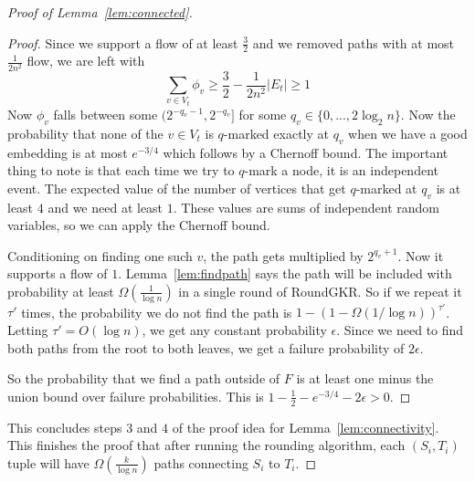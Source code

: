 \documentclass[12pt]{article}
\begin{document}
\begin{proof}[Proof of Lemma~\ref{lem:connected}]
\begin{proof}
Since we support a flow of at least $\frac{3}{2}$ and we removed paths with at most $\frac{1}{2n^2}$ flow, we are left with
\[ \sum_{v \in V_t} \phi_v \geq \frac{3}{2} - \dfrac{1}{2n^2}|E_t| \geq 1 \]
Now $\phi_v$ falls between some $(2^{-q_v-1}, 2^{-q_v}]$ for some $q_v \in \{0, ..., 2\log_2 n\}$. Now the probability that none of the $v \in V_t$ is $q$-marked exactly at $q_v$ when we have a good embedding is at most $e^{-3/4}$ which follows by a Chernoff bound. The important thing to note is that each time we try to $q$-mark a node, it is an independent event. The expected value of the number of vertices that get $q$-marked at $q_v$ is at least $4$ and we need at least $1$. These values are sums of independent random variables, so we can apply the Chernoff bound.

Conditioning on finding one such $v$, the path gets multiplied by $2^{q_v+1}$. Now it supports a flow of $1$. Lemma~\ref{lem:findpath} says the path will be included with probability at least $\Omega(\frac{1}{\log n})$ in a single round of RoundGKR. So if we repeat it $\tau'$ times, the probability we do not find the path is $1 - (1 - \Omega(1/\log n))^{\tau'}$. Letting $\tau' = O(\log n)$, we get any constant probability $\epsilon$. Since we need to find both paths from the root to both leaves, we get a failure probability of $2\epsilon$.

So the probability that we find a path outside of $F$ is at least one minus the union bound over failure probabilities. This is $1 - \frac{1}{2} - e^{-3/4} - 2\epsilon > 0$. 
\end{proof}

This concludes steps $3$ and $4$ of the proof idea for Lemma~\ref{lem:connectivity}. This finishes the proof that after running the rounding algorithm, each $(S_i, T_i)$ tuple will have $\Omega(\frac{k}{\log n})$ paths connecting $S_i$ to $T_i$. 

\end{proof}
\end{document}
